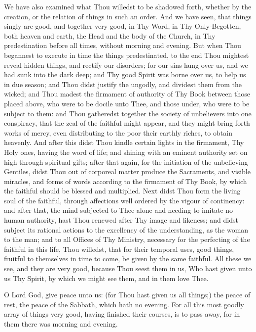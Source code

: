 \documentclass[b5paper,openright,12pt,twoside]{book}
\begin{document}
We have also examined what Thou willedst to be shadowed forth, whether
by the creation, or the relation of things in such an order. And we have
seen, that things singly are good, and together very good, in Thy Word,
in Thy Only-Begotten, both heaven and earth, the Head and the body of
the Church, in Thy predestination before all times, without morning
and evening. But when Thou begannest to execute in time the things
predestinated, to the end Thou mightest reveal hidden things, and
rectify our disorders; for our sins hung over us, and we had sunk into
the dark deep; and Thy good Spirit was borne over us, to help us in due
season; and Thou didst justify the ungodly, and dividest them from the
wicked; and Thou madest the firmament of authority of Thy Book between
those placed above, who were to be docile unto Thee, and those under,
who were to be subject to them: and Thou gatheredst together the society
of unbelievers into one conspiracy, that the zeal of the faithful might
appear, and they might bring forth works of mercy, even distributing to
the poor their earthly riches, to obtain heavenly. And after this didst
Thou kindle certain lights in the firmament, Thy Holy ones, having the
word of life; and shining with an eminent authority set on high through
spiritual gifts; after that again, for the initiation of the unbelieving
Gentiles, didst Thou out of corporeal matter produce the Sacraments, and
visible miracles, and forms of words according to the firmament of Thy
Book, by which the faithful should be blessed and multiplied. Next
didst Thou form the living soul of the faithful, through affections well
ordered by the vigour of continency: and after that, the mind subjected
to Thee alone and needing to imitate no human authority, hast Thou
renewed after Thy image and likeness; and didst subject its rational
actions to the excellency of the understanding, as the woman to the man;
and to all Offices of Thy Ministry, necessary for the perfecting of the
faithful in this life, Thou willedst, that for their temporal uses, good
things, fruitful to themselves in time to come, be given by the same
faithful. All these we see, and they are very good, because Thou seest
them in us, Who hast given unto us Thy Spirit, by which we might see
them, and in them love Thee.

O Lord God, give peace unto us: (for Thou hast given us all things;) the
peace of rest, the peace of the Sabbath, which hath no evening. For
all this most goodly array of things very good, having finished their
courses, is to pass away, for in them there was morning and evening.
\end{document}

